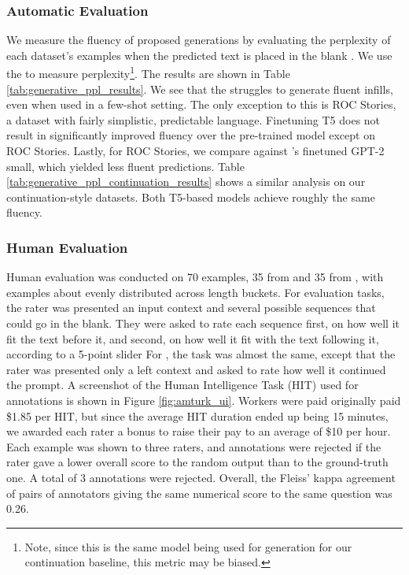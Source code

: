 \subsubsection{Automatic Evaluation}
We measure the fluency of proposed generations by evaluating the perplexity of each dataset's examples when the predicted text is placed in the blank \citep{donahue2020enabling}.
We use the \LLM{} to measure perplexity\footnote{Note, since this is the same model being used for generation for our continuation baseline, this metric may be biased.}.
The results are shown in Table \ref{tab:generative_ppl_results}.
We see that the \LLM{} struggles to generate fluent infills, even when used in a few-shot setting.
The only exception to this is ROC Stories, a dataset with fairly simplistic, predictable language.
Finetuning T5 does not result in significantly improved fluency over the pre-trained model except on ROC Stories. 
Lastly, for ROC Stories, we compare against \citet{donahue2020enabling}'s finetuned GPT-2 small, which yielded less fluent predictions.
Table \ref{tab:generative_ppl_continuation_results} shows a similar analysis on our continuation-style datasets. Both T5-based models achieve roughly the same fluency. 

\subsubsection{Human Evaluation}
Human evaluation was conducted on 70 examples, 35 from \rwpFITB{} and 35 from \rwpFITE, with examples about evenly distributed across length buckets.
For \rwpFITB{} evaluation tasks, the rater was presented an input context and several possible sequences that could go in the blank. 
They were asked to rate each sequence first, on how well it fit the text before it, and second, on how well it fit with the text following it, according to a 5-point slider 
For \rwpFITB{}, the task was almost the same, except that the rater was presented only a left context and asked to rate how well it continued the prompt.
A screenshot of the Human Intelligence Task (HIT) used for annotations is shown in Figure \ref{fig:amturk_ui}. Workers were paid originally paid \$1.85 per HIT, but since the average HIT duration ended up being 15 minutes, we awarded each rater a bonus to raise their pay to an average of \$10 per hour.
Each example was shown to three raters, and annotations were rejected if the rater gave a lower overall score to the random output than to the ground-truth one.
A total of 3 annotations were rejected.
Overall, the Fleiss' kappa agreement of pairs of annotators giving the same numerical score to the same question was 0.26.

